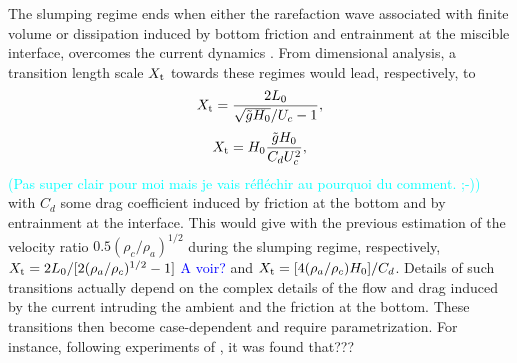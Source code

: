 \documentclass[twocolumn]{article}
\newcommand*{\marie}{\textcolor{Cyan}}
\begin{document}
The slumping regime ends when either the rarefaction wave associated with finite volume or dissipation induced by bottom friction and entrainment at the miscible interface, overcomes the current dynamics \citep{???}.
From dimensional analysis, a transition length scale $X_{\rm t}$ towards these regimes would lead, respectively, to
\begin{equation}
	\label{eq:Xt_inertial}
	\displaystyle    X_{\rm t}=  \frac{2L_0 }{\sqrt{\tilde{g}H_0}/U_c - 1},
\end{equation}
\begin{equation}
	\label{eq:Xt_drag}
	\displaystyle    X_{\rm t}=H_0  \frac{\tilde{g}H_0}{C_dU_c^2},
\end{equation}
\marie{(Pas super clair pour moi mais je vais réfléchir au pourquoi du comment. ;-))}
with $C_d$ some drag coefficient induced by friction at the bottom and by entrainment at the interface. This would give with the previous estimation of the velocity ratio $0.5(\rho_c/\rho_a)^{1/2}$ during the slumping regime, respectively,
$X_{\rm t}=2L_0/[2(\rho_a/\rho_c)^{1/2}-1]$ \textcolor{blue}{A voir? } and $X_{\rm t}=[4(\rho_a/\rho_c)H_0]/C_d$.
Details of such transitions actually depend on the complex details of the flow and drag induced by the current intruding the ambient and the friction at the bottom. These transitions then become case-dependent and require parametrization. For instance, following experiments of \cite{Rottman1983}, it was found that???

\end{document}
